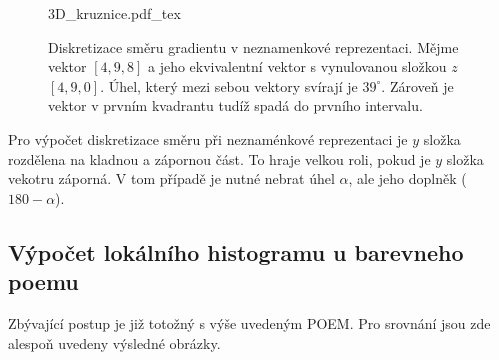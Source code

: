 \documentclass{report}
\begin{document}
\begin{figure}[H]
    \centering    
    \def\svgwidth{\columnwidth}
	{3D_kruznice.pdf_tex}    
    \caption{Diskretizace směru gradientu v neznamenkové reprezentaci. Mějme vektor $[4, 9, 8]$ a jeho ekvivalentní vektor s vynulovanou složkou $z$ $[4,9, 0]$. Úhel, který mezi sebou vektory svírají je $39 ^\circ$. Zároveň je vektor v prvním kvadrantu tudíž spadá do prvního intervalu.}
    \label{fig: diskretizace3D}
\end{figure}

\par Pro výpočet diskretizace směru při neznaménkové reprezentaci je $y$ složka rozdělena na kladnou a zápornou část. To hraje velkou roli, pokud je $y$ složka vekotru záporná. V tom případě je nutné nebrat úhel $\alpha$, ale jeho doplněk ($ 180 - \alpha$).

\subsection{Výpočet lokálního histogramu u barevneho poemu}
Zbývající postup je již totožný s výše uvedeným POEM. Pro srovnání jsou zde alespoň uvedeny výsledné obrázky. 
\end{document}
